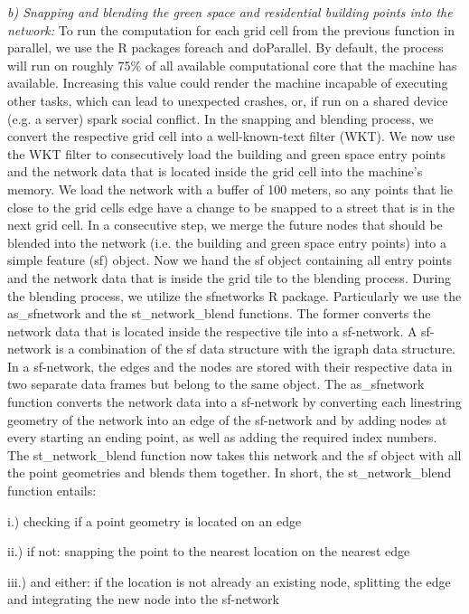 \documentclass[10pt]{article}
\begin{document}
\textit{b) Snapping and blending the green space and residential building points into the network:} To run the computation for each grid cell from the previous function in parallel, we use the R packages foreach and doParallel. By default, the process will run on roughly 75\% of all available computational core that the machine has available. Increasing this value could render the machine incapable of executing other tasks, which can lead to unexpected crashes, or, if run on a shared device (e.g. a server) spark social conflict. In the snapping and blending process, we convert the respective grid cell into a well-known-text filter (WKT). We now use the WKT filter to consecutively load the building and green space entry points and the network data that is located inside the grid cell into the machine’s memory. We load the network with a buffer of 100 meters, so any points that lie close to the grid cells edge have a change to be snapped to a street that is in the next grid cell. In a consecutive step, we merge the future nodes that should be blended into the network (i.e. the building and green space entry points) into a simple feature (sf) object. Now we hand the sf object containing all entry points and the network data that is inside the grid tile to the blending process. During the blending process, we utilize the sfnetworks R package. Particularly we use the as\_sfnetwork and the st\_network\_blend functions. The former converts the network data that is located inside the respective tile into a sf-network. A sf-network is a combination of the sf data structure with the igraph data structure. In a sf-network, the edges and the nodes are stored with their respective data in two separate data frames but belong to the same object. The as\_sfnetwork function converts the network data into a sf-network by converting each linestring geometry of the network into an edge of the sf-network and by adding nodes at every starting an ending point, as well as adding the required index numbers. The st\_network\_blend function now takes this network and the sf object with all the point geometries and blends them together. In short, the st\_network\_blend function entails:

i.) checking if a point geometry is located on an edge 

ii.) if not: snapping the point to the nearest location on the nearest edge 

iii.) and either: if the location is not already an existing node, splitting the edge and integrating the new node into the sf-network
\end{document}
